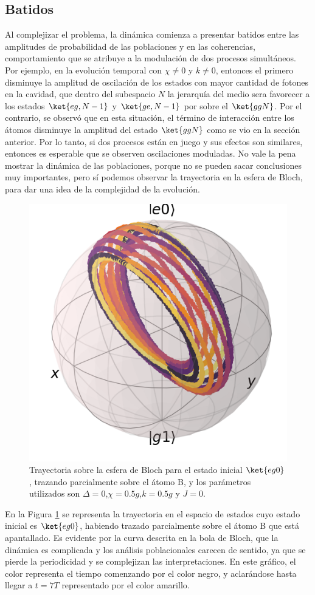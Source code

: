 \subsection{Batidos}

Al complejizar el problema, la dinámica comienza a presentar batidos entre las amplitudes de probabilidad de las poblaciones y en las coherencias, comportamiento que se atribuye a la modulación de dos procesos simultáneos. Por ejemplo, en la evolución temporal con $\chi\neq0$ y $k\neq0$, entonces el primero disminuye la amplitud de oscilación de los estados con mayor cantidad de fotones en la cavidad, que dentro del subespacio $N$ la jerarquía del medio sera favorecer a los estados $\ket{eg,N-1}$ y $\ket{ge,N-1}$ por sobre el $\ket{ggN}$. Por el contrario, se observó que en esta situación, el término de interacción entre los átomos disminuye la amplitud del estado $\ket{ggN}$ como se vio en la sección anterior. Por lo tanto, si dos procesos están en juego y sus efectos son similares, entonces es esperable que se observen oscilaciones moduladas. No vale la pena mostrar la dinámica de las poblaciones, porque no se pueden sacar conclusiones muy importantes, pero sí podemos observar la trayectoria en la esfera de Bloch, para dar una idea de la complejidad de la evolución.
\begin{figure}[h]
    \centering
    \includegraphics[width=0.5\linewidth]{figuras/ch4/eg0 bloch AC a=0 d=0.0 x=0.5 k=0.5 J=0.0 gamma=0.0 p=0.0.png}
    \caption{Trayectoria sobre la esfera de Bloch para el estado inicial $\ket{eg0}$, trazando parcialmente sobre el átomo B, y los parámetros utilizados son $\Delta=0$,$\chi=0.5g$,$k=0.5g$ y $J=0$.}
    \label{fig4:eg0 bloch batidos}
\end{figure}
En la Figura \ref{fig4:eg0 bloch batidos} se representa la trayectoria en el espacio de estados cuyo estado inicial es $\ket{eg0}$, habiendo trazado parcialmente sobre el átomo B que está apantallado. Es evidente por la curva descrita en la bola de Bloch, que la dinámica es complicada y los análisis poblacionales carecen de sentido, ya que se pierde la periodicidad y se complejizan las interpretaciones. En este gráfico, el color representa el tiempo comenzando por el color negro, y aclarándose hasta llegar a $t=7T$ representado por el color amarillo. 
